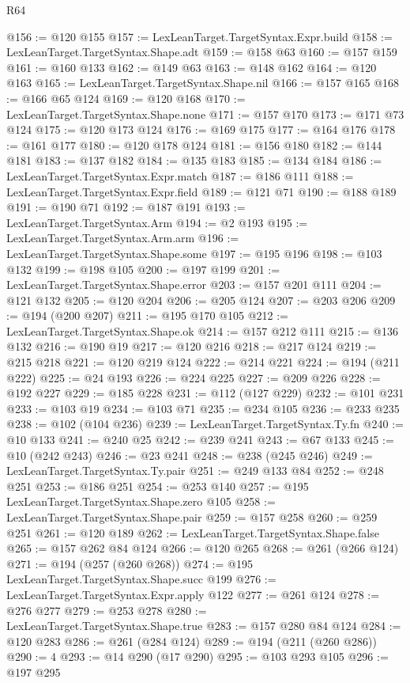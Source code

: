 \begin{lexlean}{R64}
\begin{coremodule}
@156 := @120 @155
@157 := LexLeanTarget.TargetSyntax.Expr.build
@158 := LexLeanTarget.TargetSyntax.Shape.adt
@159 := @158 @63
@160 := @157 @159
@161 := @160 @133
@162 := @149 @63
@163 := @148 @162
@164 := @120 @163
@165 := LexLeanTarget.TargetSyntax.Shape.nil
@166 := @157 @165
@168 := @166 @65 @124
@169 := @120 @168
@170 := LexLeanTarget.TargetSyntax.Shape.none
@171 := @157 @170
@173 := @171 @73 @124
@175 := @120 @173 @124
@176 := @169 @175
@177 := @164 @176
@178 := @161 @177
@180 := @120 @178 @124
@181 := @156 @180
@182 := @144 @181
@183 := @137 @182
@184 := @135 @183
@185 := @134 @184
@186 := LexLeanTarget.TargetSyntax.Expr.match
@187 := @186 @111
@188 := LexLeanTarget.TargetSyntax.Expr.field
@189 := @121 @71
@190 := @188 @189
@191 := @190 @71
@192 := @187 @191
@193 := LexLeanTarget.TargetSyntax.Arm
@194 := @2 @193
@195 := LexLeanTarget.TargetSyntax.Arm.arm
@196 := LexLeanTarget.TargetSyntax.Shape.some
@197 := @195 @196
@198 := @103 @132
@199 := @198 @105
@200 := @197 @199
@201 := LexLeanTarget.TargetSyntax.Shape.error
@203 := @157 @201 @111
@204 := @121 @132
@205 := @120 @204
@206 := @205 @124
@207 := @203 @206
@209 := @194 (@200 @207)
@211 := @195 @170 @105
@212 := LexLeanTarget.TargetSyntax.Shape.ok
@214 := @157 @212 @111
@215 := @136 @132
@216 := @190 @19
@217 := @120 @216
@218 := @217 @124
@219 := @215 @218
@221 := @120 @219 @124
@222 := @214 @221
@224 := @194 (@211 @222)
@225 := @24 @193
@226 := @224 @225
@227 := @209 @226
@228 := @192 @227
@229 := @185 @228
@231 := @112 (@127 @229)
@232 := @101 @231
@233 := @103 @19
@234 := @103 @71
@235 := @234 @105
@236 := @233 @235
@238 := @102 (@104 @236)
@239 := LexLeanTarget.TargetSyntax.Ty.fn
@240 := @10 @133
@241 := @240 @25
@242 := @239 @241
@243 := @67 @133
@245 := @10 (@242 @243)
@246 := @23 @241
@248 := @238 (@245 @246)
@249 := LexLeanTarget.TargetSyntax.Ty.pair
@251 := @249 @133 @84
@252 := @248 @251
@253 := @186 @251
@254 := @253 @140
@257 := @195 LexLeanTarget.TargetSyntax.Shape.zero @105
@258 := LexLeanTarget.TargetSyntax.Shape.pair
@259 := @157 @258
@260 := @259 @251
@261 := @120 @189
@262 := LexLeanTarget.TargetSyntax.Shape.false
@265 := @157 @262 @84 @124
@266 := @120 @265
@268 := @261 (@266 @124)
@271 := @194 (@257 (@260 @268))
@274 := @195 LexLeanTarget.TargetSyntax.Shape.succ @199
@276 := LexLeanTarget.TargetSyntax.Expr.apply @122
@277 := @261 @124
@278 := @276 @277
@279 := @253 @278
@280 := LexLeanTarget.TargetSyntax.Shape.true
@283 := @157 @280 @84 @124
@284 := @120 @283
@286 := @261 (@284 @124)
@289 := @194 (@211 (@260 @286))
@290 := 4
@293 := @14 @290 (@17 @290)
@295 := @103 @293 @105
@296 := @197 @295

\end{coremodule}
\end{lexlean}
